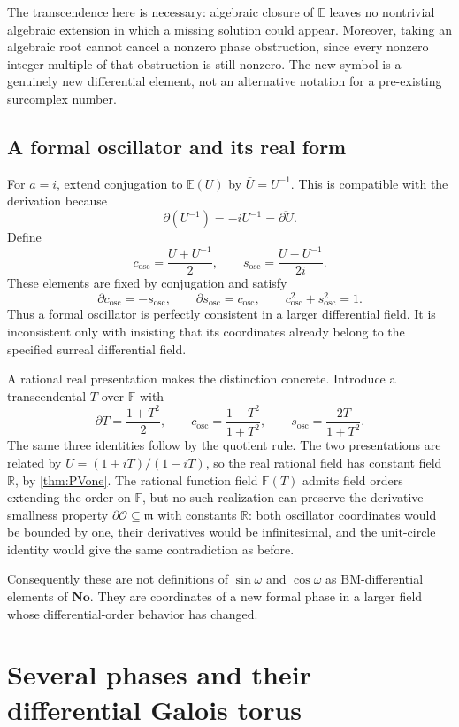 \documentclass[11pt,a4paper]{article}
\numberwithin{equation}{section}
\theoremstyle{definition}
\theoremstyle{remark}
\newcommand{\No}{\mathbf{No}}
\newcommand{\F}{\mathbb F}
\newcommand{\E}{\mathbb E}
\newcommand{\R}{\mathbb R}
\newcommand{\OO}{\mathcal O}
\newcommand{\mm}{\mathfrak m}
\newcommand{\D}{\partial}
\begin{document}
The transcendence here is necessary: algebraic closure of $\E$ leaves no
nontrivial algebraic extension in which a missing solution could appear.
Moreover, taking an algebraic root cannot cancel a nonzero phase
obstruction, since every nonzero integer multiple of that obstruction is
still nonzero. The new symbol is a genuinely new differential element,
not an alternative notation for a pre-existing surcomplex number.

\subsection{A formal oscillator and its real form}
For $a=i$, extend conjugation to $\E(U)$ by $\bar U=U^{-1}$. This is
compatible with the derivation because
\[
 \D(U^{-1})=-iU^{-1}=\overline{\D U}.
\]
Define
\begin{equation}\label{eq:formaloscillator}
 c_{\mathrm{osc}}=\frac{U+U^{-1}}2,
 \qquad
 s_{\mathrm{osc}}=\frac{U-U^{-1}}{2i}.
\end{equation}
These elements are fixed by conjugation and satisfy
\[
 \D c_{\mathrm{osc}}=-s_{\mathrm{osc}},\qquad
 \D s_{\mathrm{osc}}=c_{\mathrm{osc}},\qquad
 c_{\mathrm{osc}}^2+s_{\mathrm{osc}}^2=1.
\]
Thus a formal oscillator is perfectly consistent in a larger differential
field. It is inconsistent only with insisting that its coordinates already
belong to the specified surreal differential field.

A rational real presentation makes the distinction concrete. Introduce a
transcendental $T$ over $\F$ with
\[
 \D T=\frac{1+T^2}{2},\qquad
 c_{\mathrm{osc}}=\frac{1-T^2}{1+T^2},\qquad
 s_{\mathrm{osc}}=\frac{2T}{1+T^2}.
\]
The same three identities follow by the quotient rule. The two
presentations are related by $U=(1+iT)/(1-iT)$, so the real rational
field has constant field $\R$, by \cref{thm:PVone}. The rational
function field $\F(T)$ admits field orders extending the order on $\F$,
but no such realization can preserve the derivative-smallness property
$\D\OO\subseteq\mm$ with constants $\R$: both oscillator coordinates
would be bounded by one, their derivatives would be infinitesimal, and the
unit-circle identity would give the same contradiction as before.

Consequently these are not definitions of $\sin\omega$ and $\cos\omega$
as BM-differential elements of $\No$. They are coordinates of a new formal
phase in a larger field whose differential-order behavior has changed.

\section{Several phases and their differential Galois torus}\label{sec:torus}
\end{document}
